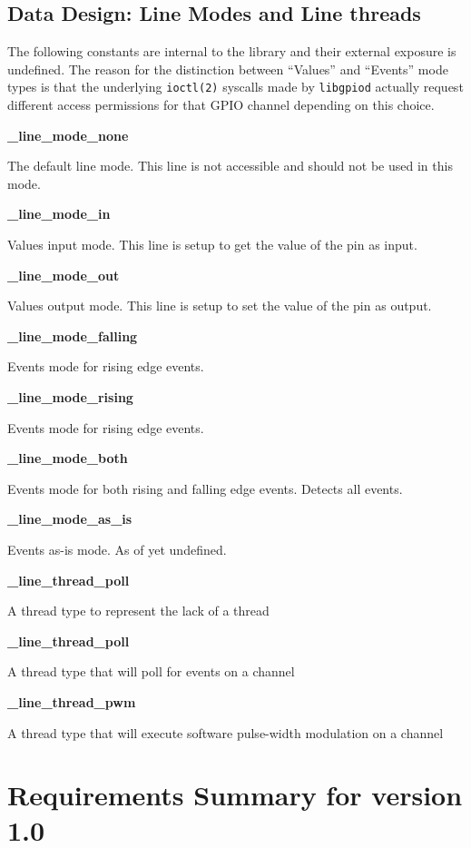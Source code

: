 \documentclass[12pt]{article}
\begin{document}
\subsection{Data Design: Line Modes and Line threads} \label{linemodes}

The following constants are internal to the library and their external exposure is undefined. The reason for the distinction between ``Values'' and ``Events'' mode types is that the underlying \texttt{ioctl(2)} syscalls made by \texttt{libgpiod} actually request different access permissions for that GPIO channel depending on this choice.

\noindent \textbf{\_line\_mode\_none}

The default line mode. This line is not accessible and should not be used in this mode.

\noindent \textbf{\_line\_mode\_in}

Values input mode. This line is setup to get the value of the pin as input.

\noindent \textbf{\_line\_mode\_out}

Values output mode. This line is setup to set the value of the pin as output.

\noindent \textbf{\_line\_mode\_falling}

Events mode for rising edge events.

\noindent \textbf{\_line\_mode\_rising}

Events mode for rising edge events.

\noindent \textbf{\_line\_mode\_both}

Events mode for both rising and falling edge events. Detects all events.

\noindent \textbf{\_line\_mode\_as\_is}

Events as-is mode. As of yet undefined.

\noindent \textbf{\_line\_thread\_poll}

A thread type to represent the lack of a thread

\noindent \textbf{\_line\_thread\_poll}

A thread type that will poll for events on a channel

\noindent \textbf{\_line\_thread\_pwm}

A thread type that will execute software pulse-width modulation on a channel

\section{Requirements Summary for version 1.0}
\end{document}
